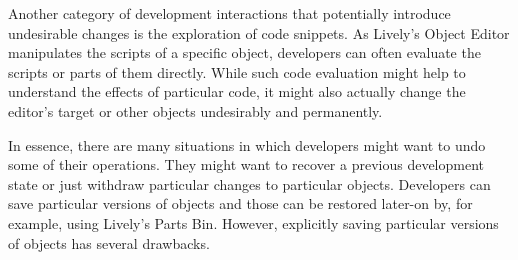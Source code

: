 Another category of development interactions that potentially introduce undesirable changes is the exploration of code snippets.
As Lively's Object Editor manipulates the scripts of a specific object, developers can often evaluate the scripts or parts of them directly.
While such code evaluation might help to understand the effects of particular code, it might also actually change the editor's target or other objects undesirably and permanently.

In essence, there are many situations in which developers might want to undo some of their operations.
They might want to recover a previous development state or just withdraw particular changes to particular objects.
Developers can save particular versions of objects and those can be restored later-on by, for example, using Lively's Parts Bin.
However, explicitly saving particular versions of objects has several drawbacks.
